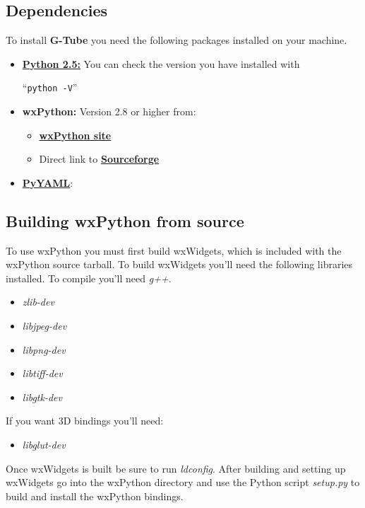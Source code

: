 \documentclass[12pt]{article}
\begin{document}
\subsection*{Dependencies}

To install {\bf G-Tube} you need the following packages installed on your machine.

\begin{itemize}
   \item {\href{http://python.org/download/}{\bf Python 2.5:}} You can check the version you have installed with
   
   ``{\tt python -V}''
   
   \item {\bf wxPython:} Version 2.8 or higher from:   
   \begin{itemize}
      \item \href{http://www.wxpython.org/download.php}{\bf wxPython site}
      \item Direct link to \href{https://sourceforge.net/projects/wxpython/files/}{\bf Sourceforge}
   \end{itemize}
   \item \href{http://pyyaml.org/ }{\bf PyYAML}:
\end{itemize}

\subsection*{Building wxPython from source}

To use wxPython you must first build wxWidgets, which is included with the wxPython source tarball. To build wxWidgets you'll need the following libraries installed. To compile you'll need {\it g++}.

\begin{itemize}
   \item {\it zlib-dev}
   \item {\it libjpeg-dev}
   \item {\it libpng-dev}
   \item {\it libtiff-dev}
   \item {\it libgtk-dev}
\end{itemize}

    If you want 3D bindings you'll need: 

\begin{itemize}
   \item {\it libglut-dev}
\end{itemize}

Once wxWidgets is built be sure to run {\it ldconfig}. After building and setting up wxWidgets go into the wxPython directory and use the Python script {\it setup.py} to build and install the wxPython bindings.
\end{document}
